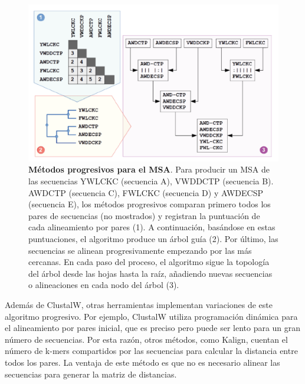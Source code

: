 \begin{figure}[htbp]
\centering
\includegraphics[width = \textwidth]{figs/clustalw.png}
\caption{\textbf{Métodos progresivos para el MSA}. Para producir un MSA de las secuencias YWLCKC (secuencia A), VWDDCTP (secuencia B). AWDCTP (secuencia C), FWLCKC (secuencia D) y AWDECSP (secuencia E), los métodos progresivos comparan primero todos los pares de secuencias (no mostrados) y registran la puntuación de cada alineamiento por pares (1). A continuación, basándose en estas puntuaciones, el algoritmo produce un árbol guía (2). Por último, las secuencias se alinean progresivamente empezando por las más cercanas. En cada paso del proceso, el algoritmo sigue la topología del árbol desde las hojas hasta la raíz, añadiendo nuevas secuencias o alineaciones en cada nodo del árbol (3).}
\label{fig:clustalw}
\end{figure}

Además de ClustalW, otras herramientas implementan variaciones de este algoritmo progresivo. Por ejemplo, ClustalW utiliza programación dinámica para el alineamiento por pares inicial, que es preciso pero puede ser lento para un gran número de secuencias. Por esta razón, otros métodos, como Kalign, cuentan el número de k-mers compartidos por las secuencias para calcular la distancia entre todos los pares. La ventaja de este método es que no es necesario alinear las secuencias para generar la matriz de distancias.

